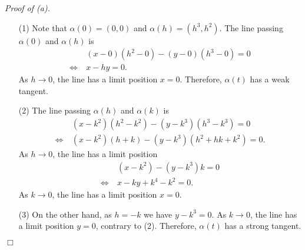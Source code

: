 \documentclass{article}
\begin{document}
\emph{Proof of (a).}
\begin{enumerate}
\item[(1)]
  Note that $\alpha(0) = (0,0)$ and $\alpha(h) = (h^3,h^2)$.
  The line passing $\alpha(0)$ and $\alpha(h)$ is
  \begin{align*}
    & \: (x - 0)(h^2 - 0) - (y - 0)(h^3 - 0) = 0 \\
    \Longleftrightarrow & \:
    x - hy = 0.
  \end{align*}
  As $h \to 0$, the line has a limit position $x = 0$.
  Therefore, $\alpha(t)$ has a weak tangent.

\item[(2)]
  The line passing $\alpha(h)$ and $\alpha(k)$ is
  \begin{align*}
    & \: (x - k^2)(h^2 - k^2) - (y - k^3)(h^3 - k^3) = 0 \\
    \Longleftrightarrow & \:
    (x - k^2)(h + k) - (y - k^3)(h^2 + hk + k^2) = 0.
  \end{align*}
  As $h \to 0$, the line has a limit position
  \begin{align*}
    & \: (x - k^2) - (y - k^3)k = 0 \\
    \Longleftrightarrow & \:
    x - ky + k^4 - k^2 = 0.
  \end{align*}
  As $k \to 0$, the line has a limit position $x = 0$.

\item[(3)]
  On the other hand, as $h = -k$ we have $y - k^3 = 0$.
  As $k \to 0$, the line has a limit position $y = 0$,
  contrary to (2).
  Therefore, $\alpha(t)$ has a strong tangent.
\end{enumerate}
$\Box$ \\
\end{document}
